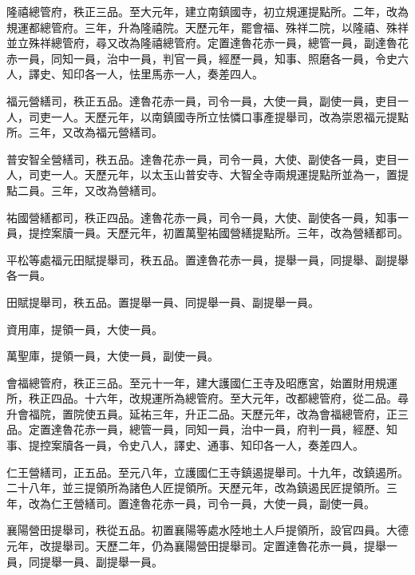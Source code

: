 \begin{pinyinscope}
 隆禧總管府，秩正三品。至大元年，建立南鎮國寺，初立規運提點所。二年，改為規運都總管府。三年，升為隆禧院。天歷元年，罷會福、殊祥二院，以隆禧、殊祥並立殊祥總管府，尋又改為隆禧總管府。定置達魯花赤一員，總管一員，副達魯花赤一員，同知一員，治中一員，判官一員，經歷一員，知事、照磨各一員，令史六人，譯史、知印各一人，怯里馬赤一人，奏差四人。



 福元營繕司，秩正五品。達魯花赤一員，司令一員，大使一員，副使一員，吏目一人，司吏一人。天歷元年，以南鎮國寺所立怯憐口事產提舉司，改為崇恩福元提點所。三年，又改為福元營繕司。



 普安智全營繕司，秩五品。達魯花赤一員，司令一員，大使、副使各一員，吏目一人，司吏一人。天歷元年，以太玉山普安寺、大智全寺兩規運提點所並為一，置提點二員。三年，又改為營繕司。



 祐國營繕都司，秩正四品。達魯花赤一員，司令一員，大使、副使各一員，知事一員，提控案牘一員。天歷元年，初置萬聖祐國營繕提點所。三年，改為營繕都司。



 平松等處福元田賦提舉司，秩五品。置達魯花赤一員，提舉一員，同提舉、副提舉各一員。



 田賦提舉司，秩五品。置提舉一員、同提舉一員、副提舉一員。



 資用庫，提領一員，大使一員。



 萬聖庫，提領一員，大使一員，副使一員。



 會福總管府，秩正三品。至元十一年，建大護國仁王寺及昭應宮，始置財用規運所，秩正四品。十六年，改規運所為總管府。至大元年，改都總管府，從二品。尋升會福院，置院使五員。延祐三年，升正二品。天歷元年，改為會福總管府，正三品。定置達魯花赤一員，總管一員，同知一員，治中一員，府判一員，經歷、知事、提控案牘各一員，令史八人，譯史、通事、知印各一人，奏差四人。



 仁王營繕司，正五品。至元八年，立護國仁王寺鎮遏提舉司。十九年，改鎮遏所。二十八年，並三提領所為諸色人匠提領所。天歷元年，改為鎮遏民匠提領所。三年，改為仁王營繕司。置達魯花赤一員，司令一員，大使一員，副使一員。



 襄陽營田提舉司，秩從五品。初置襄陽等處水陸地土人戶提領所，設官四員。大德元年，改提舉司。天歷二年，仍為襄陽營田提舉司。定置達魯花赤一員，提舉一員，同提舉一員、副提舉一員。




\end{pinyinscope}
